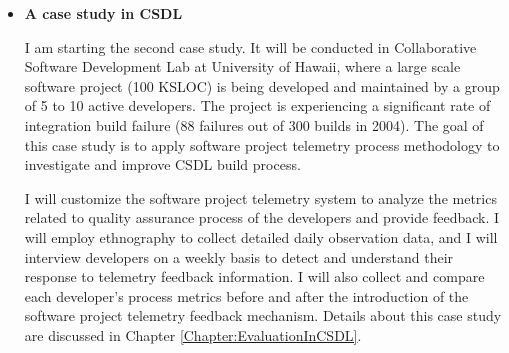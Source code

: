 \begin{itemize}
	\item \textbf{A case study in CSDL}

I am starting the second case study. It will be conducted in Collaborative Software Development Lab at University of Hawaii, where a large scale software project (100 KSLOC) is being developed and maintained by a group of 5 to 10 active developers. The project is experiencing a significant rate of integration build failure (88 failures out of 300 builds in 2004). The goal of this case study is to apply software project telemetry process methodology to investigate and improve CSDL build process. 
	
I will customize the software project telemetry system to analyze the metrics related to quality assurance process of the developers and provide feedback. I will employ ethnography to collect detailed daily observation data, and I will interview developers on a weekly basis to detect and understand their response to telemetry feedback information. I will also collect and compare each developer's process metrics before and after the introduction of the software project telemetry feedback mechanism. Details about this case study are discussed in Chapter \ref{Chapter:EvaluationInCSDL}.





\end{itemize}
